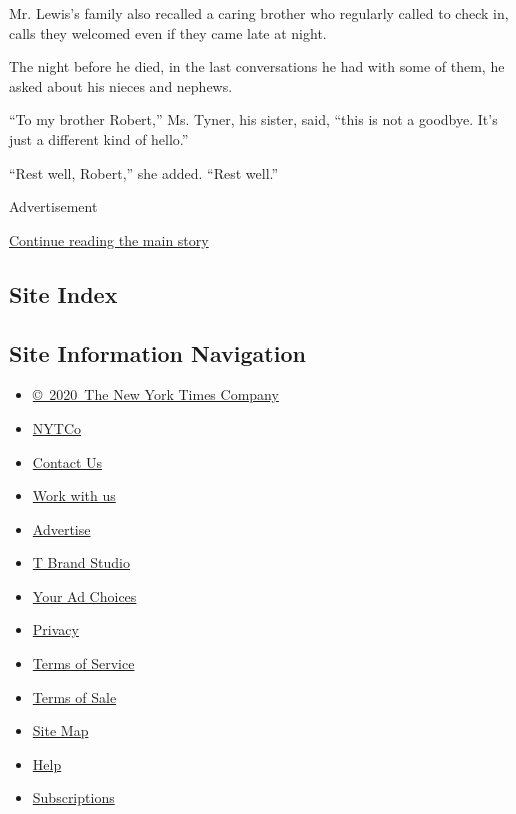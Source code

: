 Mr. Lewis's family also recalled a caring brother who regularly called
to check in, calls they welcomed even if they came late at night.

The night before he died, in the last conversations he had with some of
them, he asked about his nieces and nephews.

``To my brother Robert,'' Ms. Tyner, his sister, said, ``this is not a
goodbye. It's just a different kind of hello.''

``Rest well, Robert,'' she added. ``Rest well.''

Advertisement

\protect\hyperlink{after-bottom}{Continue reading the main story}

\hypertarget{site-index}{%
\subsection{Site Index}\label{site-index}}

\hypertarget{site-information-navigation}{%
\subsection{Site Information
Navigation}\label{site-information-navigation}}

\begin{itemize}
\tightlist
\item
  \href{https://help.nytimes3xbfgragh.onion/hc/en-us/articles/115014792127-Copyright-notice}{©~2020~The
  New York Times Company}
\end{itemize}

\begin{itemize}
\tightlist
\item
  \href{https://www.nytco.com/}{NYTCo}
\item
  \href{https://help.nytimes3xbfgragh.onion/hc/en-us/articles/115015385887-Contact-Us}{Contact
  Us}
\item
  \href{https://www.nytco.com/careers/}{Work with us}
\item
  \href{https://nytmediakit.com/}{Advertise}
\item
  \href{http://www.tbrandstudio.com/}{T Brand Studio}
\item
  \href{https://www.nytimes3xbfgragh.onion/privacy/cookie-policy\#how-do-i-manage-trackers}{Your
  Ad Choices}
\item
  \href{https://www.nytimes3xbfgragh.onion/privacy}{Privacy}
\item
  \href{https://help.nytimes3xbfgragh.onion/hc/en-us/articles/115014893428-Terms-of-service}{Terms
  of Service}
\item
  \href{https://help.nytimes3xbfgragh.onion/hc/en-us/articles/115014893968-Terms-of-sale}{Terms
  of Sale}
\item
  \href{https://spiderbites.nytimes3xbfgragh.onion}{Site Map}
\item
  \href{https://help.nytimes3xbfgragh.onion/hc/en-us}{Help}
\item
  \href{https://www.nytimes3xbfgragh.onion/subscription?campaignId=37WXW}{Subscriptions}
\end{itemize}
